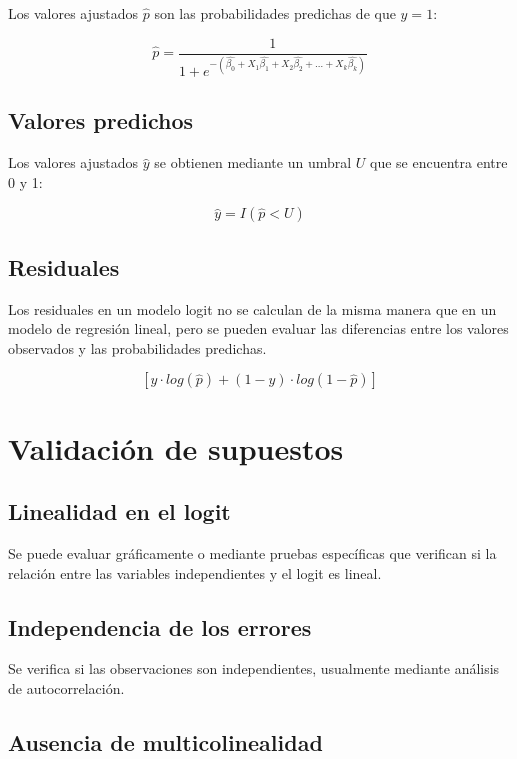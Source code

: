 \documentclass[
  letterpaper,
  DIV=11,
  numbers=noendperiod]{scrreprt}
\begin{document}
Los valores ajustados \(\hat{p}\) son las probabilidades predichas de
que \(y = 1\):

\[
\hat{p} = \frac{1}{1 + e^{-(\hat{\beta_0} + X_1\hat{\beta_1} + X_2\hat{\beta_2} + \dots + X_k\hat{\beta_k})}}
\]

\subsection{Valores predichos}\label{valores-predichos}

Los valores ajustados \(\hat{y}\) se obtienen mediante un umbral \(U\)
que se encuentra entre 0 y 1:

\[
\hat{y} = I(\hat{p} < U)
\]

\subsection{Residuales}\label{residuales-1}

Los residuales en un modelo logit no se calculan de la misma manera que
en un modelo de regresión lineal, pero se pueden evaluar las diferencias
entre los valores observados y las probabilidades predichas.

\[
 \left[y \cdot log(\hat{p}) + (1 - y) \cdot log(1 - \hat{p}) \right]
\]

\section{Validación de supuestos}\label{validaciuxf3n-de-supuestos-3}

\subsection{Linealidad en el logit}\label{linealidad-en-el-logit}

Se puede evaluar gráficamente o mediante pruebas específicas que
verifican si la relación entre las variables independientes y el logit
es lineal.

\subsection{Independencia de los
errores}\label{independencia-de-los-errores}

Se verifica si las observaciones son independientes, usualmente mediante
análisis de autocorrelación.

\subsection{Ausencia de
multicolinealidad}\label{ausencia-de-multicolinealidad}
\end{document}
